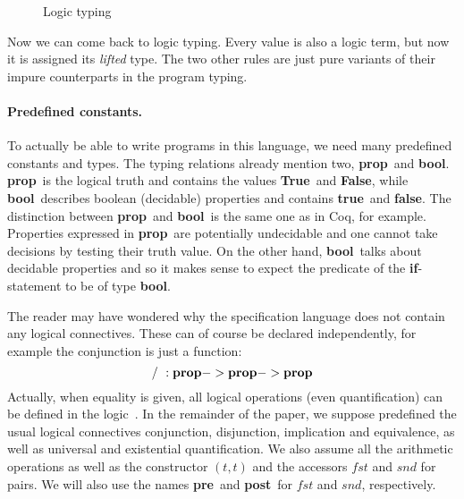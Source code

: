 \documentclass[a4paper]{llncs}
\newcommand{\letml}{{\bf let}}
\newcommand{\inml}{{\bf in}}
\newcommand{\ifml}{{\bf if}}
\newcommand{\thenml}{{\bf then}}
\newcommand{\elseml}{{\bf else}}
\newcommand{\preml}{{\bf pre}}
\newcommand{\postml}{{\bf post}}
\newcommand{\propml}{{\bf prop}}
\newcommand{\boolml}{{\bf bool}}
\newcommand{\alist}[1]{\overline{#1} }
\newcommand{\Trueml}{{\bf True}}
\newcommand{\Falseml}{{\bf False}}
\newcommand{\trueml}{{\bf true}}
\newcommand{\falseml}{{\bf false}}
\newcommand{\coq}{Coq}
\newcommand{\ceil}[1]{\lceil #1 \rceil}
\begin{document}
\begin{figure}[tbp]
  \caption{Logic typing}
  \label{fig:logictyping}
\end{figure}

Now we can come back to logic typing. Every value is also a logic term,
but now it is assigned its {\em lifted} type. The two other rules are just 
pure variants of their impure counterparts in the program typing.

\paragraph{Predefined constants.}

To actually be able to write programs in this language, we need many
predefined constants and types. The typing relations already mention two,
\propml\ and \boolml. \propml\ is the logical truth and contains the values
\Trueml\ and \Falseml, while \boolml\ describes boolean (decidable) properties
and contains \trueml\ and \falseml. The distinction between \propml\ and
\boolml\ is the same one as in \coq, for example. Properties expressed in
\propml\ are potentially undecidable and one cannot take decisions by testing
their truth value. On the other hand, \boolml\ talks about decidable
properties and so it makes sense to expect the predicate of the
\ifml-statement to be of type \boolml.

The reader may have wondered why the specification language does not contain
any logical connectives. These can of course be declared independently, for
example the conjunction is just a function: \begin{equation*} /\ :  \propml ->
\propml -> \propml \end{equation*} Actually, when equality is given, all
logical operations (even quantification) can be defined in the
logic~\cite{andrews86}.  In the remainder of the paper, we suppose
predefined the usual logical connectives conjunction, disjunction,
implication and equivalence, as well as universal and existential
quantification. We also assume all the arithmetic operations as well as the
constructor $(t,t)$  and the accessors $fst$ and $snd$ for pairs. We will also
use the names \preml\ and \postml\ for $fst$ and $snd$, respectively.
\end{document}
